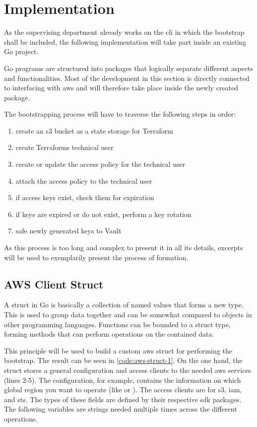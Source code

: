 \chapter{Implementation}
As the supervising department already works on the \ac{cli} in which the bootstrap shall be included, the following implementation will take part inside an existing Go project.

Go programs are structured into packages that logically separate different aspects and functionalities.
Most of the development in this section is directly connected to interfacing with \ac{aws} and will therefore take place inside the newly created  package.

The bootstrapping process will have to traverse the following steps in order:
\begin{enumerate}
    \item create an \ac{s3} bucket as a state storage for Terraform
    \item create Terraforms technical user
    \item create or update the access policy for the technical user
    \item attach the access policy to the technical user
    \item if access keys exist, check them for expiration
    \item if keys are expired or do not exist, perform a key rotation
    \item safe newly generated keys to Vault
\end{enumerate}
As this process is too long and complex to present it in all its details, excerpts will be used to exemplarily present the process of formation.

\section{AWS Client Struct}
A struct in Go is basically a collection of named values that forms a new type.
This is used to group data together and can be somewhat compared to objects in other programming languages.
Functions can be bounded to a struct type, forming methods that can perform operations on the contained data.

This principle will be used to build a custom \ac{aws} struct for performing the bootstrap.
The result can be seen in \autoref{code:aws-struct-1}.
On the one hand, the struct stores a general configuration and access clients to the needed \ac{aws} services (lines 2-5).
The configuration, for example, contains the information on which global region you want to operate (like  or ).
The access clients are for \ac{s3}, \ac{iam}, and \ac{sts}.
The types of these fields are defined by their respective \ac{sdk} packages.
The following variables are strings needed multiple times across the different operations.

